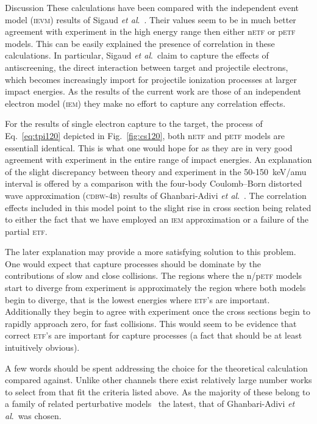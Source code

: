 \documentclass[aps, pra, reprint, groupedaddress, amsfonts,
               amsmath, amssymb, showpacs, nofootinbib]{revtex4-1}
\begin{document}
\begin{section}{Discussion \label{sec:disc}}
   These calculations have been compared with the independent event model (\textsc{ievm}) results of
   Sigaud \textit{et al}.~\cite{SM-03}. Their values seem to be in much better agreement with experiment
   in the high energy range then either n\textsc{etf} or p\textsc{etf} models. This can be easily
   explained the presence of correlation in these calculations. In particular, Sigaud \textit{et al}.\
   claim to capture the effects of antiscreening, the direct interaction between target and projectile
   electrons, which becomes increasingly import for projectile ionization processes at larger impact
   energies. As the results of the current work are those of an independent electron model
   (\textsc{iem}) they make no effort to capture any correlation effects.

   For the results of single electron capture to the target, the process of Eq.~\eqref{eq:tpi120}
   depicted in Fig.~\ref{fig:cs120}, both n\textsc{etf} and p\textsc{etf} models are essentiall
   identical. This is what one would hope for as they are in very good agreement with experiment in the
   entire range of impact energies. An explanation of the slight discrepancy between theory and
   experiment in the 50-150~keV/amu interval is offered by a comparison with the four-body Coulomb–Born
   distorted wave approximation (\textsc{cdbw-4b}) results of Ghanbari-Adivi
   \textit{et al}.~\cite{GAG15}. The correlation effects included in this model point to the slight rise
   in cross section being related to either the fact that we have employed an \textsc{iem} approximation
   or a failure of the partial \textsc{etf}.

   The later explanation may provide a more satisfying solution to this problem. One would expect that
   capture processes should be dominate by the contributions of slow and close collisions. The regions
   where the n/p\textsc{etf} models start to diverge from experiment is approximately the region where
   both models begin to diverge, that is the lowest energies where \textsc{etf}'s are important.
   Additionally they begin to agree with experiment once the cross sections begin to rapidly approach
   zero, for fast collisions. This would seem to be evidence that correct \textsc{etf}'s are important
   for capture processes (a fact that should be at least intuitively obvious).

   A few words should be spent addressing the choice for the theoretical calculation compared against.
   Unlike other channels there exist relatively large number works to select from that fit the criteria
   listed above. As the majority of these belong to a family of related perturbative
   models~\cite{Mancev96, BOC05, Mancev-07, MG-10, NTC11, GG-12b, GAG15} the latest, that of
   Ghanbari-Adivi \textit{et al}.\ was chosen.


\end{section}
\end{document}
